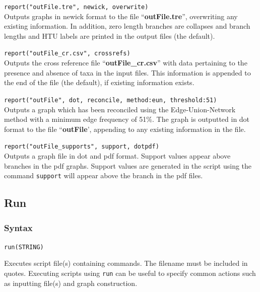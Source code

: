 	\begin{example}
	
		\item{\texttt{report("outFile.tre", newick, overwrite)}\\ Outputs graphs in newick 
		format to the file ``\textbf{outFile.tre}'', overwriting any existing information.
		In addition, zero length branches are collapses and branch lengths and HTU 
		labels are printed in the output files (the default).}
		
		\item{\texttt{report("outFile\_cr.csv", crossrefs)}\\ Outputs the cross reference file 
		``\textbf{outFile\_cr.csv}'' with data pertaining to the presence and absence of 
		taxa in the input files. This information is appended to the end of the file (the 
		default), if existing information exists.}
		
		\item{\texttt{report("outFile", dot, reconcile, method:eun, threshold:51)}\\ Outputs a
		graph which has been reconciled using the Edge-Union-Network method with a 
		minimum edge frequency of 51\%. The graph is outputted in dot format to the 
		file ``\textbf{outFile}', appending to any existing information in the file.}
		
		\item{\texttt{report("outFile\_supports", support, dotpdf)}\\ Outputs a graph file in 
		dot and pdf format. Support values appear above branches in the pdf graphs.
		Support values are generated in the script using the command \texttt{support}
		will appear above the branch in the pdf files.}
		
	\end{example}
		
\subsection{Run}
	\subsubsection{Syntax}
		\texttt{run(STRING)}
		
	\begin{phygdescription}
		{Executes \phyg script file(s) containing commands. The filename must be 
		included in quotes. Executing scripts using \texttt{run} can be useful to specify 
		common actions such as inputting file(s) and graph construction.}
	\end{phygdescription}
	
